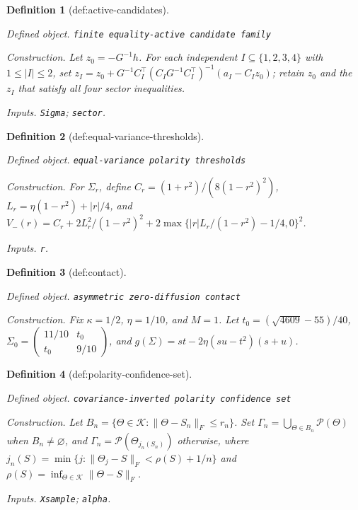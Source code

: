 \documentclass{article}
\newtheorem{definition}{Definition}
\begin{document}
\begin{definition}[def:active-candidates]\label{def:active-candidates}
\par\smallskip\noindent\emph{Defined object.} \texttt{finite equality-\allowbreak{}active candidate family}
\par\smallskip\noindent\emph{Construction.} Let \(z_0=-G^{-1}h\). For each independent \(I\subseteq\{1,2,3,4\}\) with \(1\le|I|\le2\), set \(z_I=z_0+G^{-1}C_I^{\top}(C_IG^{-1}C_I^{\top})^{-1}(a_I-C_Iz_0)\); retain \(z_0\) and the \(z_I\) that satisfy all four sector inequalities.
\par\smallskip\noindent\emph{Inputs.} \texttt{Sigma}; \texttt{sector}.
\end{definition}

\begin{definition}[def:equal-variance-thresholds]\label{def:equal-variance-thresholds}
\par\smallskip\noindent\emph{Defined object.} \texttt{equal-\allowbreak{}variance polarity thresholds}
\par\smallskip\noindent\emph{Construction.} For \(\Sigma_r\), define \(C_r=(1+r^2)/(8(1-r^2)^2)\), \(L_r=\eta(1-r^2)+|r|/4\), and \(V_-(r)=C_r+2L_r^2/(1-r^2)^2+2\max\{|r|L_r/(1-r^2)-1/4,0\}^2\).
\par\smallskip\noindent\emph{Inputs.} \texttt{r}.
\end{definition}

\begin{definition}[def:contact]\label{def:contact}
\par\smallskip\noindent\emph{Defined object.} \texttt{asymmetric zero-\allowbreak{}diffusion contact}
\par\smallskip\noindent\emph{Construction.} Fix \(\kappa=1/2\), \(\eta=1/10\), and \(M=1\). Let \(t_0=(\sqrt{4609}-55)/40\), \(\Sigma_0=\begin{pmatrix}11/10&t_0\\t_0&9/10\end{pmatrix}\), and \(g(\Sigma)=st-2\eta(su-t^2)(s+u)\).
\end{definition}

\begin{definition}[def:polarity-confidence-set]\label{def:polarity-confidence-set}
\par\smallskip\noindent\emph{Defined object.} \texttt{covariance-\allowbreak{}inverted polarity confidence set}
\par\smallskip\noindent\emph{Construction.} Let \(B_n=\{\Theta\in\mathcal K:\lVert\Theta-S_n\rVert_F\le r_n\}\). Set \(\Gamma_n=\bigcup_{\Theta\in B_n}\mathcal P(\Theta)\) when \(B_n\ne\varnothing\), and \(\Gamma_n=\mathcal P(\Theta_{j_n(S_n)})\) otherwise, where \(j_n(S)=\min\{j:\lVert\Theta_j-S\rVert_F<\rho(S)+1/n\}\) and \(\rho(S)=\inf_{\Theta\in\mathcal K}\lVert\Theta-S\rVert_F\).
\par\smallskip\noindent\emph{Inputs.} \texttt{Xsample}; \texttt{alpha}.
\end{definition}
\end{document}
